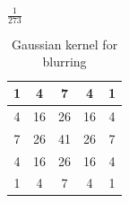 \begin{table}[!htb]
\begin{center}
$\frac{1}{273}$
\begin{tabular}{|c|c|c|c|c|}\hline
1 & 4 & 7 & 4 & 1\\ \hline
4 &  16 &  26 &  16 &  4 \\ \hline
7 &  26 &  41 &  26 &  7\\ \hline
4 &  16 &  26 &  16 &  4\\ \hline
1 &  4 &  7 &  4 &  1 \\ \hline
\end{tabular}

\caption{Gaussian kernel for blurring}
\label{tbl:gauss}
\end{center}
\end{table}
